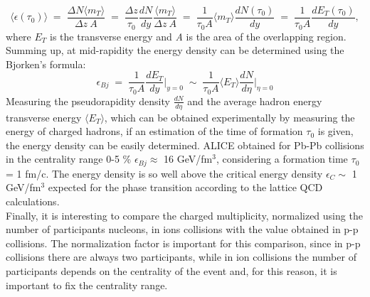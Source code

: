 \begin{equation}
 \langle \epsilon(\tau_{0}) \rangle \; = \; \frac{\Delta N\langle m_{T}\rangle}{\Delta z\:A}\;=\;\frac{\Delta z}{\tau_{0}}\frac{dN}{dy}\frac{\langle m_{T}\rangle}{\Delta z\:A}\;=\;\frac{1}{\tau_{0} A} \langle m_{T} \rangle \frac{dN(\tau_{0})}{dy}\;=\;\frac{1}{\tau_{0} A}\frac{dE_{T}(\tau_{0})}{dy},
\end{equation}
where $E_{T}$ is the transverse energy and \textit{A} is the area of the overlapping region.\\
Summing up, at mid-rapidity the energy density can be determined using the Bjorken's formula:
\begin{equation}
 \epsilon_{Bj}\;=\; \frac{1}{\tau_{0} A}\frac{dE_{T}}{dy}\Big|_{y=0}\;\sim\;\frac{1}{\tau_{0} A}\langle E_{T} \rangle \frac{dN}{d\eta}\Big|_{\eta=0}
\end{equation}
Measuring the pseudorapidity density $\frac{dN}{d\eta}$ and the average hadron energy transverse energy $\langle E_{T} \rangle$, which can be obtained experimentally by measuring the energy of charged hadrons, if an estimation of the time of formation $\tau_{0}$ is given, the energy density can be easily determined. ALICE obtained for Pb-Pb collisions in the centrality range 0-5 \% $\epsilon_{Bj} \approx$ 16 GeV/fm$^{3}$, considering a formation time $\tau_{0}$ = 1 fm/c. The energy density is so well above the critical energy density $\epsilon_{C} \sim$ 1 GeV/fm$^{3}$ expected for the phase transition according to the lattice QCD calculations.\\
Finally, it is interesting to compare the charged multiplicity, normalized using the number of participants nucleons, in ions collisions with the value obtained in p-p collisions. The normalization factor is important for this comparison, since in p-p collisions there are always two participants, while in ion collisions the number of participants depends on the centrality of the event and, for this reason, it is important to fix the centrality range.
%
